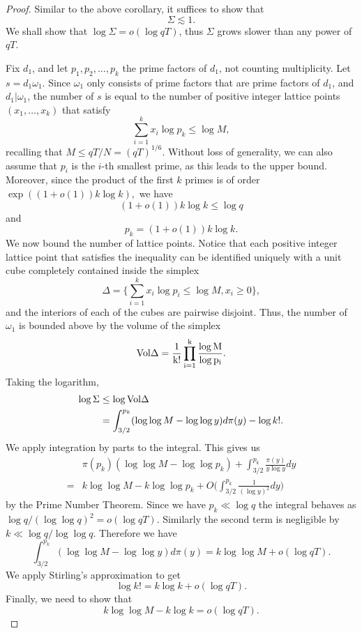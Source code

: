 \begin{proof}
    Similar to the above corollary, it suffices to show that \[
    \Sigma\lesssim 1.
    \]
    We shall show that $\log \Sigma = o(\log qT)$, thus $\Sigma$ grows slower than any power of $qT$.

    Fix $d_1$, and let $p_1,p_2,\ldots, p_k$ the prime factors of $d_1$, not counting multiplicity. Let $s=d_1\omega_1$. Since $\omega_1$ only consists of prime factors that are prime factors of $d_1$, and $d_1|\omega_1$, the number of $s$ is equal to the number of positive integer lattice points $(x_1,\dots,x_k)$ that satisfy \[
    \sum_{i=1}^{k}x_i\log p_k\leq \log M,
    \]
    recalling that $M\leq qT/N= (qT)^{1/6}$. Without loss of generality, we can also assume that $p_i$ is the $i$-th smallest prime, as this leads to the upper bound. Moreover, since the product of the first $k$ primes is of order $\exp((1+o(1))k\log k ),$ we have \[
    (1+o(1))k\log k \leq \log q
    \]
    and \[
    p_k = (1+o(1))k\log k.
    \]
    We now bound the number of lattice points. Notice that each positive integer lattice point that satisfies the inequality can be identified uniquely with a unit cube completely contained inside the simplex \[
    \Delta=\{\sum_{i=1}^{k}x_i\log p_i\leq \log M,x_i\geq 0\},
    \]
    and the interiors of each of the cubes are pairwise disjoint. Thus, the number of $\omega_1$ is bounded above by the volume of the simplex \[
    \rm{Vol}\Delta = \frac{1}{k!}\prod_{i=1}^{k}\frac{\log M}{\log p_i}.
    \]
    Taking the logarithm, \begin{align*}
        \log \Sigma&\leq \log \rm{Vol}\Delta\\
        &=\int_{3/2}^{p_k}(\log \log M-\log \log y) d \pi(y) -\log k!.
    \end{align*}
    We apply integration by parts to the integral. This gives us\begin{align*}
    &\pi(p_k)(\log \log M -\log \log p_k)+\int_{3/2}^{p_k}\frac{\pi(y)}{y\log y}d y\\
    =&k\log \log M - k\log \log p_k + O\Big(\int_{3/2}^{p_k}\frac{1}{(\log y)^2}d y\Big)
    \end{align*}
    by the Prime Number Theorem. Since we have $p_k\ll \log q$ the integral behaves as $\log q / (\log \log q)^2 = o(\log qT)$. Similarly the second term is negligible by $k\ll \log q/\log \log q$. Therefore we have \[
        \int_{3/2}^{p_k}(\log \log M-\log \log y) d \pi(y)=k\log \log M+o(\log qT).
    \]
    We apply Stirling's approximation to get \[
    \log k! = k\log k + o(\log qT).
    \]
    Finally, we need to show that \[
    k\log \log M - k\log k =o( \log qT).
    \]
    

\end{proof}
